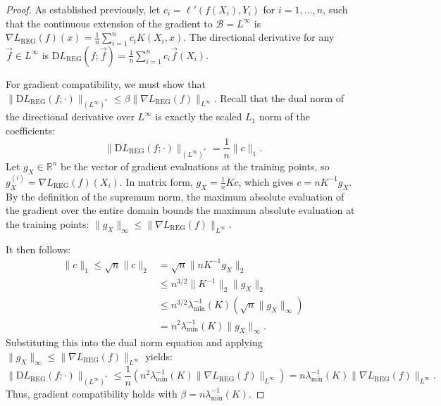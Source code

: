 \documentclass[10pt,a4paper]{amsart}
\newcommand{\D}{\mathrm{D}}
\newcommand{\R}{\mathbb{R}}
\begin{document}
\begin{proof}
    As established previously, let $c_i = \ell'(f(X_i), Y_i)$ for $i=1, \dots, n$, such that the continuous extension of the gradient to $\mathcal{B} = L^\infty$ is $\nabla L_\mathrm{REG}(f)(x) = \frac{1}{n} \sum_{i=1}^n c_i K(X_i, x)$. The directional derivative for any $\vec{f} \in L^\infty$ is $\D L_\mathrm{REG}(f; \vec{f}) = \frac{1}{n} \sum_{i=1}^n c_i \vec{f}(X_i)$.

    For gradient compatibility,
    we must show that $\lVert \D L_\mathrm{REG}(f; \cdot) \rVert_{(L^\infty)^*} \leq \beta \lVert \nabla L_\mathrm{REG}(f) \rVert_{L^\infty}$.
    Recall that the dual norm of the directional derivative over $L^\infty$ is exactly the scaled $L_1$ norm of the coefficients:
    \[
        \lVert \D L_\mathrm{REG}(f; \cdot) \rVert_{(L^\infty)^*} = \frac{1}{n} \lVert c \rVert_1.
    \]
    Let $g_X \in \R^n$ be the vector of gradient evaluations at the training points, so $g_X^{(i)} = \nabla L_\mathrm{REG}(f)(X_i)$. In matrix form, $g_X = \frac{1}{n} K c$, which gives $c = n K^{-1} g_X$. 
    By the definition of the supremum norm, the maximum absolute evaluation of the gradient over the entire domain bounds the maximum absolute evaluation at the training points: $\lVert g_X \rVert_\infty \leq \lVert \nabla L_\mathrm{REG}(f) \rVert_{L^\infty}$.

    It then follows:
    \begin{align*}
        \lVert c \rVert_1 
        \leq \sqrt{n} \lVert c \rVert_2 
        &= \sqrt{n} \lVert n K^{-1} g_X \rVert_2 \\
        &\leq n^{3/2} \lVert K^{-1} \rVert_2 \lVert g_X \rVert_2 \\
        &\leq n^{3/2} \lambda_{\min}^{-1}(K) \left( \sqrt{n} \lVert g_X \rVert_\infty \right) \\
        &= n^2 \lambda_{\min}^{-1}(K) \lVert g_X \rVert_\infty.
    \end{align*}
    Substituting this into the dual norm equation and applying $\lVert g_X \rVert_\infty \leq \lVert \nabla L_\mathrm{REG}(f) \rVert_{L^\infty}$ yields:
    \[
        \lVert \D L_\mathrm{REG}(f; \cdot) \rVert_{(L^\infty)^*} \leq \frac{1}{n} \left( n^2 \lambda_{\min}^{-1}(K) \lVert \nabla L_\mathrm{REG}(f) \rVert_{L^\infty} \right) = n \lambda_{\min}^{-1}(K) \lVert \nabla L_\mathrm{REG}(f) \rVert_{L^\infty}.
    \]
    Thus, gradient compatibility holds with $\beta = n \lambda_{\min}^{-1}(K)$.


\end{proof}
\end{document}

